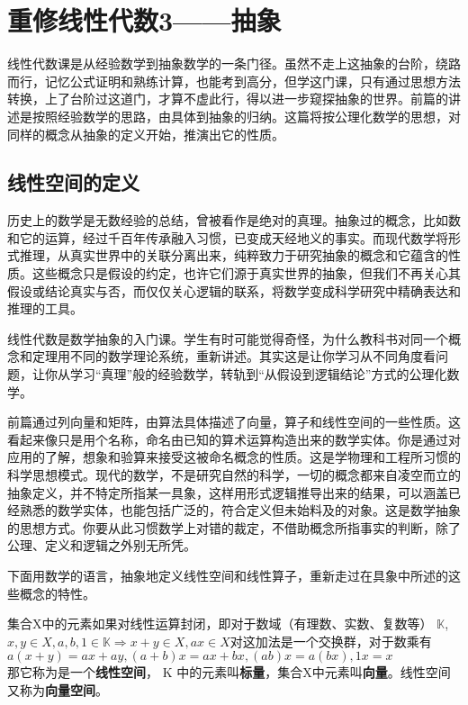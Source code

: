 
\section{重修线性代数3——抽象 }
线性代数课是从经验数学到抽象数学的一条门径。虽然不走上这抽象的台阶，绕路而行，记忆公式证明和熟练计算，也能考到高分，但学这门课，只有通过思想方法转换，上了台阶过这道门，才算不虚此行，得以进一步窥探抽象的世界。前篇的讲述是按照经验数学的思路，由具体到抽象的归纳。这篇将按公理化数学的思想，对同样的概念从抽象的定义开始，推演出它的性质。

\subsection{线性空间的定义} 

历史上的数学是无数经验的总结，曾被看作是绝对的真理。抽象过的概念，比如数和它的运算，经过千百年传承融入习惯，已变成天经地义的事实。而现代数学将形式推理，从真实世界中的关联分离出来，纯粹致力于研究抽象的概念和它蕴含的性质。这些概念只是假设的约定，也许它们源于真实世界的抽象，但我们不再关心其假设或结论真实与否，而仅仅关心逻辑的联系，将数学变成科学研究中精确表达和推理的工具。

线性代数是数学抽象的入门课。学生有时可能觉得奇怪，为什么教科书对同一个概念和定理用不同的数学理论系统，重新讲述。其实这是让你学习从不同角度看问题，让你从学习“真理”般的经验数学，转轨到“从假设到逻辑结论”方式的公理化数学。

前篇通过列向量和矩阵，由算法具体描述了向量，算子和线性空间的一些性质。这看起来像只是用个名称，命名由已知的算术运算构造出来的数学实体。你是通过对应用的了解，想象和验算来接受这被命名概念的性质。这是学物理和工程所习惯的科学思想模式。现代的数学，不是研究自然的科学，一切的概念都来自凌空而立的抽象定义，并不特定所指某一具象，这样用形式逻辑推导出来的结果，可以涵盖已经熟悉的数学实体，也能包括广泛的，符合定义但未始料及的对象。这是数学抽象的思想方式。你要从此习惯数学上对错的裁定，不借助概念所指事实的判断，除了公理、定义和逻辑之外别无所凭。

下面用数学的语言，抽象地定义线性空间和线性算子，重新走过在具象中所述的这些概念的特性。

\kaishu
集合X中的元素如果对线性运算封闭，即对于数域（有理数、实数、复数等） $\mathbb{K}$,$ x, y \in X, a, b, 1 \in \mathbb{K} \Rightarrow  x+y \in X, ax \in X $对这加法是一个交换群，对于数乘有$ a(x+y)=ax+ay, (a+b)x=ax+bx, (ab)x=a(bx),1x=x $\\
那它称为是一个\textbf{线性空间}， K 中的元素叫\textbf{标量}，集合X中元素叫\textbf{向量}。线性空间又称为\textbf{向量空间}。

